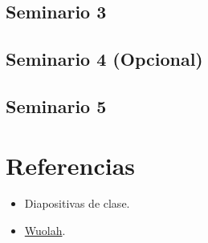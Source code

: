 \documentclass[a4paper,12pt]{article}
\begin{document}
\subsection{Seminario 3}


\subsection{Seminario 4 (Opcional)}


\subsection{Seminario 5}


\section{Referencias}
\begin{itemize}
    \item Diapositivas de clase.
    \item \href{https://www.wuoalh.com/}{Wuolah}.
\end{itemize}
\end{document}
